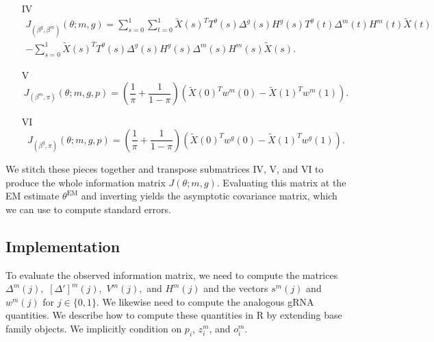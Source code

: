 \documentclass[12pt]{article}
\begin{document}
\begin{appendices}
\begin{itemize}
\begin{multline*}
\end{multline*}
\item[IV] \begin{multline*}
J_{(\beta^g, \beta^m)}(\theta; m, g) = \sum_{s=0}^1 \sum_{t=0}^1 \tilde{X}(s)^T  T^\theta(s) {\Delta}^g(s) {H}^g(s) T^\theta(t){\Delta}^m(t) {H}^m(t) \tilde{X}(t) \\ - \sum_{s=0}^1 \tilde{X}(s)^T T^\theta(s) {\Delta}^g(s) {H}^g(s) {\Delta}^m(s) {H}^m(s) \tilde{X}(s).
\end{multline*}
\item[V] $$ J_{(\beta^m, \pi)}(\theta; m, g, p) = \left( \frac{1}{\pi} + \frac{1}{1 - \pi} \right) \left( \tilde{X}(0)^T w^m(0) - \tilde{X}(1)^T w^m(1)\right).  $$
\item[VI] $$ J_{(\beta^g, \pi)}(\theta; m, g, p) = \left(\frac{1}{\pi} + \frac{1}{1 - \pi} \right) \left( \tilde{X}(0)^T w^g(0) - \tilde{X}(1)^T w^g(1)\right).$$
\end{itemize}
We stitch these pieces together and transpose submatrices IV, V, and VI to produce the whole information matrix $J(\theta; m, g)$. Evaluating this matrix at the EM estimate $\theta^\textrm{EM}$ and inverting yields the asymptotic covariance matrix, which we can use to compute standard errors.

\subsection{Implementation}
To evaluate the observed information matrix, we need to compute the matrices $\Delta^m(j),$ $[\Delta']^m(j),$ $V^m(j),$ and $H^m(j)$ and the vectors $s^m(j)$ and $w^m(j)$ for $j \in \{0,1\}$. We likewise need to compute the analogous gRNA quantities. We describe how to compute these quantities in R by extending base family objects. We implicitly condition on $p_i$, $z^m_i$, and $o^m_i$.


\end{appendices}
\end{document}
